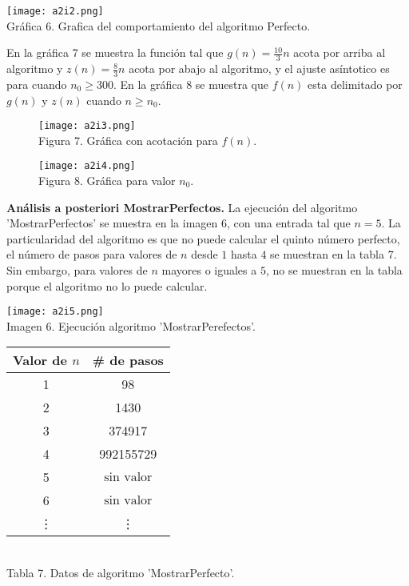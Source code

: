 \documentclass[12pt,twoside]{article}
\begin{document}
\medskip

\begin{minipage}{\linewidth}
  \centering
  \texttt{[image: a2i2.png]}
  \\
  Gráfica 6. Grafica del comportamiento del algoritmo Perfecto.
\end{minipage}
\newpage

En la gráfica 7 se muestra la función tal que $g(n)=\frac{10}{3}n$ acota por arriba al algoritmo y $z(n)=\frac{8}{3}n$ acota por abajo al algoritmo, y el ajuste asíntotico es para cuando $n_0\geq 300$. En la gráfica 8 se muestra que $f(n)$ esta delimitado por $g(n)$ y $z(n)$ cuando $n\geq n_0$.
\medskip
\begin{figure}[h]
  \begin{center}
    \texttt{[image: a2i3.png]}
    \\
    Figura 7. Gráfica con acotación para $f(n)$.
  \end{center}
\end{figure}
\begin{figure}[h]
  \begin{center}
    \texttt{[image: a2i4.png]}
    \\
    Figura 8. Gráfica para valor $n_0$.
  \end{center}
\end{figure}

\newpage

\textbf{Análisis a posteriori MostrarPerfectos.}
La ejecución del algoritmo 'MostrarPerfectos' se muestra en la imagen 6, con una entrada tal que $n=5$. La particularidad del algoritmo es que no puede calcular el quinto número perfecto, el número de pasos para valores de $n$ desde $1$ hasta $4$ se muestran en la tabla 7. Sin embargo, para valores de $n$ mayores o iguales a $5$, no se muestran en la tabla porque el algoritmo no lo puede calcular.
\medskip

\begin{minipage}{.45\linewidth}
  \centering
  \texttt{[image: a2i5.png]}
  \\
  Imagen 6. Ejecución algoritmo 'MostrarPerefectos'.
\end{minipage}\hfill
\begin{minipage}{.45\linewidth}
  \centering
  \begin{tabular}{|c|c|}
    \hline
    \textbf{Valor de $n$} & \textbf{\# de pasos} \\
    \hline
    1  & 98 \\
    2  & 1430 \\
    3  & 374917 \\
    4  & 992155729 \\
    5  & $\text{sin valor}$ \\
    6  & $\text{sin valor}$ \\
    \vdots & \vdots\\
    \hline
  \end{tabular}
  \\
  Tabla 7. Datos de algoritmo 'MostrarPerfecto'.
\end{minipage}
\medskip
\end{document}
